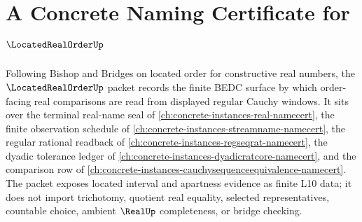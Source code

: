 \chapter{A Concrete Naming Certificate for $\LocatedRealOrderUp$}
\label{ch:concrete-instances-located-real-order-namecert}

Following Bishop and Bridges on located order for constructive real numbers, the $\LocatedRealOrderUp$ packet records the finite BEDC surface by which order-facing real comparisons are read from displayed regular Cauchy windows. It sits over the terminal real-name seal of \autoref{ch:concrete-instances-real-namecert}, the finite observation schedule of \autoref{ch:concrete-instances-streamname-namecert}, the regular rational readback of \autoref{ch:concrete-instances-regseqrat-namecert}, the dyadic tolerance ledger of \autoref{ch:concrete-instances-dyadicratcore-namecert}, and the comparison row of \autoref{ch:concrete-instances-cauchysequenceequivalence-namecert}. The packet exposes located interval and apartness evidence as finite L10 data; it does not import trichotomy, quotient real equality, selected representatives, countable choice, ambient $\RealUp$ completeness, or bridge checking.

